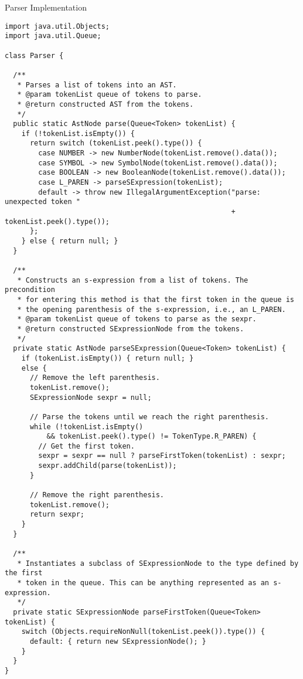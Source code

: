 \begin{cl}{Parser Implementation}
\begin{lstlisting}[language=MyJava]
import java.util.Objects;
import java.util.Queue;

class Parser {

  /**
   * Parses a list of tokens into an AST.
   * @param tokenList queue of tokens to parse.
   * @return constructed AST from the tokens.
   */
  public static AstNode parse(Queue<Token> tokenList) {
    if (!tokenList.isEmpty()) {
      return switch (tokenList.peek().type()) {
        case NUMBER -> new NumberNode(tokenList.remove().data());
        case SYMBOL -> new SymbolNode(tokenList.remove().data());
        case BOOLEAN -> new BooleanNode(tokenList.remove().data());
        case L_PAREN -> parseSExpression(tokenList);
        default -> throw new IllegalArgumentException("parse: unexpected token " 
                                                      + tokenList.peek().type());
      };
    } else { return null; }
  }

  /**
   * Constructs an s-expression from a list of tokens. The precondition
   * for entering this method is that the first token in the queue is
   * the opening parenthesis of the s-expression, i.e., an L_PAREN.
   * @param tokenList queue of tokens to parse as the sexpr.
   * @return constructed SExpressionNode from the tokens.
   */
  private static AstNode parseSExpression(Queue<Token> tokenList) {
    if (tokenList.isEmpty()) { return null; }
    else {
      // Remove the left parenthesis.
      tokenList.remove();
      SExpressionNode sexpr = null;

      // Parse the tokens until we reach the right parenthesis.
      while (!tokenList.isEmpty() 
          && tokenList.peek().type() != TokenType.R_PAREN) {
        // Get the first token.
        sexpr = sexpr == null ? parseFirstToken(tokenList) : sexpr;
        sexpr.addChild(parse(tokenList));
      }

      // Remove the right parenthesis.
      tokenList.remove();
      return sexpr;
    }
  }

  /**
   * Instantiates a subclass of SExpressionNode to the type defined by the first
   * token in the queue. This can be anything represented as an s-expression.
   */
  private static SExpressionNode parseFirstToken(Queue<Token> tokenList) {
    switch (Objects.requireNonNull(tokenList.peek()).type()) {
      default: { return new SExpressionNode(); }
    }
  }
}
\end{lstlisting}
\end{cl}

